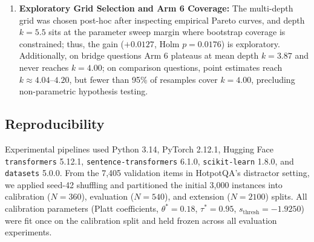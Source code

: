 \documentclass{article}
\begin{document}
\begin{enumerate}
    \item \textbf{Exploratory Grid Selection and Arm 6 Coverage:} The multi-depth grid was chosen post-hoc after inspecting empirical Pareto curves, and depth $k=5.5$ sits at the parameter sweep margin where bootstrap coverage is constrained; thus, the gain ($+0.0127$, Holm $p=0.0176$) is exploratory. Additionally, on bridge questions Arm 6 plateaus at mean depth $k=3.87$ and never reaches $k=4.00$; on comparison questions, point estimates reach $k \approx 4.04\text{--}4.20$, but fewer than 95\% of resamples cover $k=4.00$, precluding non-parametric hypothesis testing.
\end{enumerate}

\subsection{Reproducibility}
Experimental pipelines used Python 3.14, PyTorch 2.12.1, Hugging Face \texttt{transformers} 5.12.1, \texttt{sentence-transformers} 6.1.0, \texttt{scikit-learn} 1.8.0, and \texttt{datasets} 5.0.0. From the 7,405 validation items in HotpotQA's distractor setting, we applied seed-42 shuffling and partitioned the initial 3,000 instances into calibration ($N=360$), evaluation ($N=540$), and extension ($N=2100$) splits. All calibration parameters (Platt coefficients, $\theta^*=0.18$, $\tau^*=0.95$, $s_{\text{thresh}}=-1.9250$) were fit once on the calibration split and held frozen across all evaluation experiments.

\balance
\end{document}
